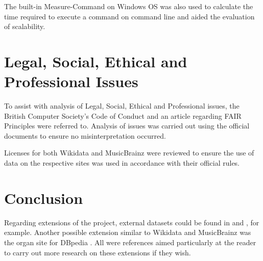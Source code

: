 The built-in Measure-Command \cite{measurecommand} on Windows OS was also used to calculate the time required to execute a command on command line and aided the evaluation of scalability. 

\section{Legal, Social, Ethical and Professional Issues}
\hspace{0.5cm} To assist with analysis of Legal, Social, Ethical and Professional issues, the British Computer Society's Code of Conduct \cite{bcs} and an article regarding FAIR Principles \cite{fairprinciples} were referred to. Analysis of issues was carried out using the official documents to ensure no misinterpretation occurred. 

Licenses for both Wikidata \cite{wikidatalicense} and MusicBrainz \cite{musicbrainzlicense} were reviewed to ensure the use of data on the respective sites was used in accordance with their official rules. 

\section{Conclusion}
\hspace{0.5cm} Regarding extensions of the project, external datasets could be found in \cite{kaggle} and \cite{googledatasetsearch}, for example. Another possible extension similar to Wikidata and MusicBrainz was the organ site for DBpedia \cite{organdbpedia}. All were references aimed particularly at the reader to carry out more research on these extensions if they wish. 
